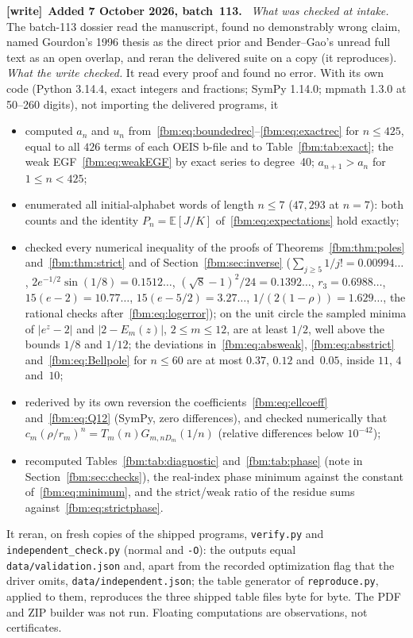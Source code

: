 \documentclass[11pt]{article}
\theoremstyle{remark}\newtheorem{remark}[theorem]{Remark}
\newcommand{\E}{\mathbb E}
\newcommand{\file}[1]{\nolinkurl{#1}}
\newenvironment{writenote}[1][]{\par\smallskip\begingroup\small
 \noindent\textbf{[write]}\if\relax\detokenize{#1}\relax\else~\textbf{#1.}\fi\ }%
 {\par\endgroup\smallskip}
\begin{document}
\begin{writenote}[Added 7 October 2026, batch~113]
\emph{What was checked at intake.} The batch-113 dossier read the manuscript,
found no demonstrably wrong claim, named Gourdon's 1996 thesis as the direct
prior and Bender--Gao's unread full text as an open overlap, and reran the
delivered suite on a copy (it reproduces). \emph{What the write checked.} It
read every proof and found no error. With its own code (Python 3.14.4, exact
integers and fractions; SymPy 1.14.0; mpmath 1.3.0 at 50--260 digits), not
importing the delivered programs, it
\begin{itemize}\raggedright
\item computed $a_n$ and $u_n$ from~\eqref{fbm:eq:boundedrec}--\eqref{fbm:eq:exactrec}
for $n\le425$, equal to all $426$ terms of each OEIS b-file and to
Table~\ref{fbm:tab:exact}; the weak EGF~\eqref{fbm:eq:weakEGF} by exact series
to degree~40; $a_{n+1}>a_n$ for $1\le n<425$;
\item enumerated all initial-alphabet words of length $n\le7$ ($47{,}293$ at
$n=7$): both counts and the identity $P_n=\E[J/K]$
of~\eqref{fbm:eq:expectations} hold exactly;
\item checked every numerical inequality of the proofs of
Theorems~\ref{fbm:thm:poles} and~\ref{fbm:thm:strict} and of
Section~\ref{fbm:sec:inverse} ($\sum_{j\ge5}1/j!=0.00994\ldots$,
$2e^{-1/2}\sin(1/8)=0.1512\ldots$, $(\sqrt8-1)^2/24=0.1392\ldots$,
$r_3=0.6988\ldots$, $15(e-2)=10.77\ldots$, $15(e-5/2)=3.27\ldots$,
$1/(2(1-\rho))=1.629\ldots$, the rational checks after~\eqref{fbm:eq:logerror});
on the unit circle the sampled minima of $|e^z-2|$ and $|2-E_m(z)|$,
$2\le m\le12$, are at least $1/2$, well above the bounds $1/8$ and $1/12$;
the deviations in~\eqref{fbm:eq:absweak}, \eqref{fbm:eq:absstrict}
and~\eqref{fbm:eq:Bellpole} for $n\le60$ are at most $0.37$, $0.12$
and~$0.05$, inside $11$, $4$ and~$10$;
\item rederived by its own reversion the coefficients~\eqref{fbm:eq:ellcoeff}
and~\eqref{fbm:eq:Q12} (SymPy, zero differences), and checked numerically that
$c_m(\rho/r_m)^n=T_m(n)G_{m,nD_m}(1/n)$ (relative differences below
$10^{-42}$);
\item recomputed Tables~\ref{fbm:tab:diagnostic} and~\ref{fbm:tab:phase}
(note in Section~\ref{fbm:sec:checks}), the real-index phase minimum against
the constant of~\eqref{fbm:eq:minimum}, and the strict/weak ratio of the
residue sums against~\eqref{fbm:eq:strictphase}.
\end{itemize}
It reran, on fresh copies of the shipped programs, \file{verify.py} and
\file{independent_check.py} (normal and \texttt{-O}): the outputs equal
\file{data/validation.json} and, apart from the recorded optimization flag that
the driver omits, \file{data/independent.json}; the table generator of
\file{reproduce.py}, applied to them, reproduces the three shipped table files
byte for byte. The PDF and ZIP builder was not run. Floating computations are
observations, not certificates.


\end{writenote}
\end{document}
